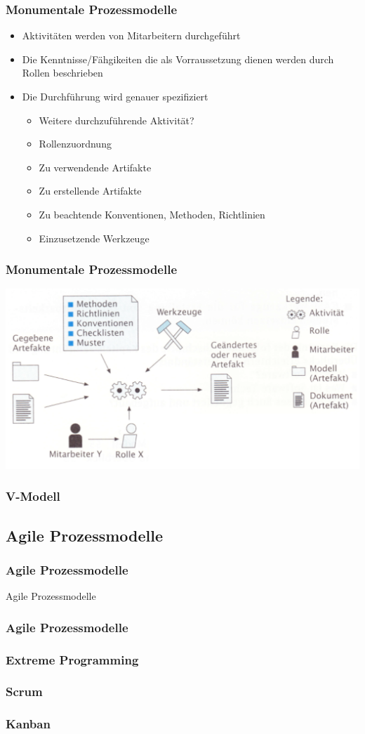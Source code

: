 \begin{frame}
\frametitle{Monumentale Prozessmodelle}
	\begin{itemize}
		\item Aktivitäten werden von Mitarbeitern durchgeführt
		\item Die Kenntnisse/Fähgikeiten die als Vorraussetzung dienen
		werden durch Rollen beschrieben
		\item Die Durchführung wird genauer spezifiziert
		\begin{itemize}
			\item Weitere durchzuführende Aktivität?
			\item Rollenzuordnung
			\item Zu verwendende Artifakte
			\item Zu erstellende Artifakte
			\item Zu beachtende Konventionen, Methoden, Richtlinien
			\item Einzusetzende Werkzeuge
		\end{itemize}
	\end{itemize}
\end{frame}

\begin{frame}
\frametitle{Monumentale Prozessmodelle}
	\center\includegraphics[width=1\textwidth,
			keepaspectratio=true]{bilder/prozessmodell.png}
\end{frame}

\begin{frame}
\frametitle{V-Modell}
	
\end{frame}

\subsection{Agile Prozessmodelle}
\begin{frame}
\frametitle{Agile Prozessmodelle}
\huge Agile Prozessmodelle
\end{frame}

\begin{frame}
\frametitle{Agile Prozessmodelle}

\end{frame}

\begin{frame}
\frametitle{Extreme Programming}
	
\end{frame}

\begin{frame}
\frametitle{Scrum}
	
\end{frame}

\begin{frame}
\frametitle{Kanban}
	
\end{frame}